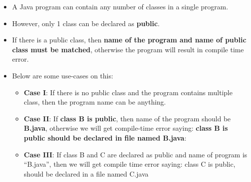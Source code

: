 \begin{flushleft}
	
	\begin{itemize}
		\item A Java program can contain any number of classes in a single program. 
		\item However, only 1 class can be declared as \textbf{public}.
		\item If there is a public class, then \textbf{name of the program and name of public class must be matched}, otherwise the program will result in compile time error.
		\item Below are some use-cases on this:
		
		\begin{itemize}
			\item \textbf{Case I}: If there is no public class and the program contains multiple class, then the program name can be anything. 
			\bigskip
			\bigskip
			
			\bigskip
			\item \textbf{Case II}: If \textbf{class B is public}, then name of the program should be \textbf{B.java}, otherwise we will get compile-time error saying: \textbf{class B is public should be declared in file named B.java}:
			\bigskip
			\bigskip
			
		
			\bigskip
			
			\item \textbf{Case III}: If class B and C are declared as public and name of program is “B.java”, then we will get compile time error saying: class C is public, should be declared in a file named C.java
			
			\bigskip


\end{itemize}
\end{itemize}
\end{flushleft}
